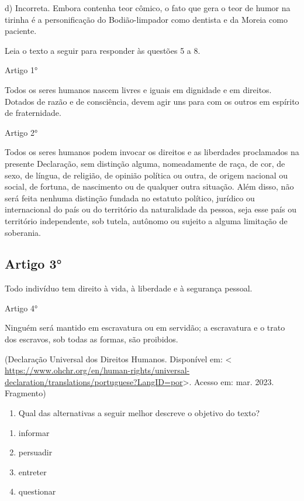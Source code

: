 {d) Incorreta. Embora contenha teor cômico, o fato que gera o teor de
humor na tirinha é a personificação do Bodião-limpador como dentista e
da Moreia como paciente.

Leia o texto a seguir para responder às questões 5 a 8.

Artigo 1°

Todos os seres humanos nascem livres e iguais em dignidade e em
direitos. Dotados de razão e de consciência, devem agir uns para com os
outros em espírito de fraternidade.

Artigo 2°

Todos os seres humanos podem invocar os direitos e as liberdades
proclamados na presente Declaração, sem distinção alguma, nomeadamente
de raça, de cor, de sexo, de língua, de religião, de opinião política ou
outra, de origem nacional ou social, de fortuna, de nascimento ou de
qualquer outra situação. Além disso, não será feita nenhuma distinção
fundada no estatuto político, jurídico ou internacional do país ou do
território da naturalidade da pessoa, seja esse país ou território
independente, sob tutela, autônomo ou sujeito a alguma limitação de
soberania.

\subsection{Artigo 3°}

Todo indivíduo tem direito à vida, à liberdade e à segurança pessoal.

Artigo 4°

Ninguém será mantido em escravatura ou em servidão; a escravatura e o
trato dos escravos, sob todas as formas, são proibidos.

(Declaração Universal dos Direitos Humanos. Disponível em: \textless{}
\url{https://www.ohchr.org/en/human-rights/universal-declaration/translations/portuguese?LangID=por}\textgreater.
Acesso em: mar. 2023. Fragmento)

\begin{enumerate}
\def\labelenumi{\arabic{enumi}.}
\setcounter{enumi}{4}
\tightlist
\item
  Qual das alternativas a seguir melhor descreve o objetivo do texto?
\end{enumerate}

\begin{enumerate}
\def\labelenumi{\alph{enumi})}
\item
  informar
\item
  persuadir
\item
  entreter
\item
  questionar
\end{enumerate}

}
